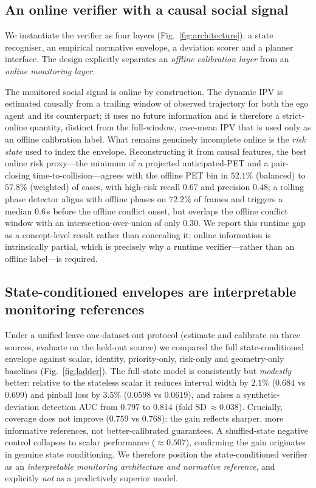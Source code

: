 \documentclass[12pt,a4paper]{article}
\begin{document}
\subsection{An online verifier with a causal social signal}
We instantiate the verifier as four layers (Fig.~\ref{fig:architecture}): a state
recogniser, an empirical normative envelope, a deviation scorer and a planner interface.
The design explicitly separates an \emph{offline calibration layer} from an \emph{online
monitoring layer}.

The monitored social signal is online by construction. The dynamic IPV is estimated
causally from a trailing window of observed trajectory for both the ego agent and its
counterpart; it uses no future information and is therefore a strict-online quantity,
distinct from the full-window, case-mean IPV that is used only as an offline calibration
label. What remains genuinely incomplete online is the \emph{risk state} used to index the
envelope. Reconstructing it from causal features, the best online risk proxy---the minimum
of a projected anticipated-PET and a pair-closing time-to-collision---agrees with the
offline PET bin in $52.1\%$ (balanced) to $57.8\%$ (weighted) of cases, with high-risk
recall $0.67$ and precision $0.48$; a rolling phase detector aligns with offline phases on
$72.2\%$ of frames and triggers a median $0.6$\,s before the offline conflict onset, but
overlaps the offline conflict window with an intersection-over-union of only $0.30$. We
report this runtime gap as a concept-level result rather than concealing it: online
information is intrinsically partial, which is precisely why a runtime verifier---rather
than an offline label---is required.

\subsection{State-conditioned envelopes are interpretable monitoring references}
Under a unified leave-one-dataset-out protocol (estimate and calibrate on three sources,
evaluate on the held-out source) we compared the full state-conditioned envelope against
scalar, identity, priority-only, risk-only and geometry-only baselines
(Fig.~\ref{fig:ladder}). The full-state model is consistently but \emph{modestly} better:
relative to the stateless scalar it reduces interval width by $2.1\%$ ($0.684$ vs $0.699$)
and pinball loss by $3.5\%$ ($0.0598$ vs $0.0619$), and raises a synthetic-deviation
detection AUC from $0.797$ to $0.814$ (fold SD\,$\approx0.038$). Crucially, coverage does
not improve ($0.759$ vs $0.768$): the gain reflects sharper, more informative references,
not better-calibrated guarantees. A shuffled-state negative control collapses to scalar
performance ($\approx0.507$), confirming the gain originates in genuine state conditioning.
We therefore position the state-conditioned verifier as an \emph{interpretable monitoring
architecture and normative reference}, and explicitly \emph{not} as a predictively superior
model.
\end{document}
